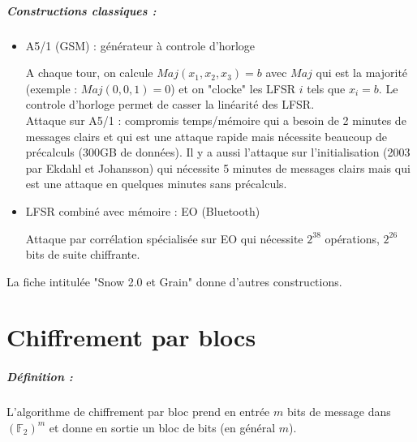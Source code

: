 \documentclass[12pt,a4paper]{report}
\begin{document}
\paragraph{Constructions classiques :\\}
\begin{itemize}
\item A5/1 (GSM) : générateur à controle d'horloge 
\begin{figure}[h!]
	\centering
  \scalebox{0.6}{}	
\end{figure}

A chaque tour, on calcule $Maj(x_1,x_2,x_3) = b$ avec $Maj$ qui est la majorité (exemple : $Maj(0,0,1) = 0$) et on "clocke" les LFSR $i$ tels que $x_i=b$. Le controle d'horloge permet de casser la linéarité des LFSR.\\
Attaque sur A5/1 : compromis temps/mémoire qui a besoin de 2 minutes de messages clairs et qui est une attaque rapide mais nécessite beaucoup de précalculs (300GB de données). Il y a aussi l'attaque sur l'initialisation (2003 par Ekdahl et Johansson) qui nécessite 5 minutes de messages clairs mais qui est une attaque en quelques minutes sans précalculs.

\item LFSR combiné avec mémoire : EO (Bluetooth)
\begin{figure}[h!]
	\centering
  \scalebox{0.6}{}	
\end{figure}

Attaque par corrélation spécialisée sur EO qui nécessite $2^{38}$ opérations, $2^{26}$ bits de suite chiffrante.
\end{itemize}
La fiche intitulée "Snow 2.0 et Grain" donne d'autres constructions.

\chapter{Chiffrement par blocs}
\paragraph{Définition :\\}
L'algorithme de chiffrement par bloc prend en entrée $m$ bits de message dans $(\mathbb{F}_2)^m$ et donne en sortie un bloc de bits (en général $m$).
\begin{center}
  \scalebox{0.6}{}	
\end{center}

\begin{center}
  \scalebox{0.6}{}	
\end{center}
\end{document}
